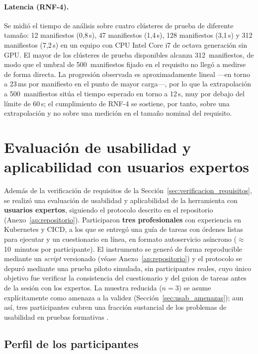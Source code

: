 \paragraph{Latencia (RNF-4).} Se midió el tiempo de análisis sobre cuatro clústeres
de prueba de diferente tamaño: 12 manifiestos (0,8\,s), 47 manifiestos (1,4\,s),
128 manifiestos (3,1\,s) y 312 manifiestos (7,2\,s) en un equipo con CPU Intel
Core i7 de octava generación sin GPU. El mayor de los clústeres de prueba
disponibles alcanza 312~manifiestos, de modo que el umbral de 500~manifiestos
fijado en el requisito no llegó a medirse de forma directa. La progresión
observada es aproximadamente lineal —en torno a 23\,ms por manifiesto en el punto
de mayor carga\mbox{—,} por lo que la extrapolación a 500~manifiestos sitúa el tiempo
esperado en torno a 12\,s, muy por debajo del límite de 60\,s; el cumplimiento de
RNF-4 se sostiene, por tanto, sobre una extrapolación y no sobre una medición en
el tamaño nominal del requisito.

\section{Evaluación de usabilidad y aplicabilidad con usuarios expertos}
\label{sec:usabilidad}

Además de la verificación de requisitos de la
Sección~\ref{sec:verificacion_requisitos}, se realizó una evaluación de
usabilidad y aplicabilidad de la herramienta con \textbf{usuarios expertos},
siguiendo el protocolo descrito en el repositorio (Anexo~\ref{ap:repositorio}).
Participaron \textbf{tres profesionales} con experiencia en Kubernetes y
\ac{CICD}, a los que se entregó una guía de tareas con órdenes listas para ejecutar y
un cuestionario en línea, en formato autoservicio asíncrono (\(\approx\)10~minutos
por participante). El instrumento se generó de forma reproducible mediante un
\textit{script} versionado (véase Anexo~\ref{ap:repositorio}) y el protocolo se
depuró mediante una prueba piloto simulada, sin participantes reales, cuyo único
objetivo fue verificar la consistencia del cuestionario y del guion de tareas
antes de la sesión con los expertos. La muestra reducida (\(n=3\)) se asume
explícitamente como amenaza a la validez (Sección~\ref{sec:usab_amenazas}); aun
así, tres participantes cubren una fracción sustancial de los problemas de
usabilidad en pruebas formativas \citep{Nielsen2000}.

\subsection{Perfil de los participantes}

